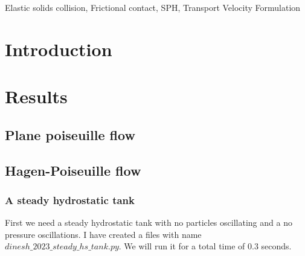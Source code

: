 \documentclass[preprint,12pt]{elsarticle}
\begin{document}
\begin{frontmatter}

  \title{}
  \author[IITB]{Dinesh Adepu}
  \author[XXX]{Pawan Negi }
  \author[University of Surrey]{Chuan Yu Wu}
\address[UoS]{Department of Aerospace Engineering, Indian Institute of
  Technology Bombay, Powai, Mumbai 400076}



\begin{abstract}

\end{abstract}

\begin{keyword}
{Elastic solids collision}, {Frictional contact}, {SPH}, {Transport Velocity Formulation}


\end{keyword}

\end{frontmatter}


\section{Introduction}
\label{sec:intro}



\FloatBarrier%
\section{Results}
\label{sec:results}


\FloatBarrier%
\subsection{Plane poiseuille flow}
\label{sec:res:ppf}


\FloatBarrier%
\subsection{Hagen-Poiseuille flow}
\label{sec:res:hpf}


\FloatBarrier%
\subsubsection{A steady hydrostatic tank}
First we need a steady hydrostatic tank with no particles oscillating and a no
pressure oscillations. I have created a files with name
$dinesh\_2023\_steady\_hs\_tank.py$. We will run it for a total time of $0.3$
seconds.
\end{document}
